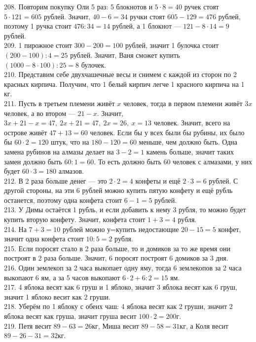 208. Повторим покупку Оли 5 раз: 5 блокнотов и $5\cdot8=40$ ручек стоят $5\cdot121=605$ рублей. Значит, $40-6=34$ ручки стоят $605-129=476$ рублей, поэтому 1 ручка стоит $476:34=14$ рублей, а 1 блокнот --- $121-8\cdot14=9$ рублей.\\
209. 1 пирожное стоит $300-200=100$ рублей, значит 1 булочка стоит $(200-100):4=25$ рублей. Значит, Ваня сможет купить $(1000-8\cdot100):25=8$ булочек.\\
210. Представим себе двухчашечные весы и снимем с каждой из сторон по 2 красных кирпича. Получим, что 1 белый кирпич легче 1 красного кирпича на 1 кг.\\
211. Пусть в третьем племени живёт $x$ человек, тогда в первом племени живёт $3x$ человек, а во втором --- $21-x.$ Значит, $3x+21-x=47,\ 2x+21=47,\ 2x=26,\ x=13$ человек. Значит, всего на острове живёт $47+13=60$ человек. Если бы у всех были бы рубины, их было бы $60\cdot2=120$ штук, что на $180-120=60$ меньше, чем должно быть. Одна замена рубинов на алмазы делает на $3-2=1$ камень больше, значит таких замен должно быть $60:1=60.$ То есть должно быть 60 человек с алмазами, у них будет $60\cdot3=180$ алмазов.\\
212. В 2 раза больше денег --- это $2\cdot2=4$ конфеты и ещё $2\cdot3=6$ рублей. С другой стороны, на эти 6 рублей можно купить пятую конфету и ещё рубль останется, поэтому одна конфета стоит $6-1=5$ рублей.\\
213. У Димы остаётся 1 рубль, и если добавить к нему 3 рубля, то можно будет купить вторую конфету. Значит, конфета стоит $1+3=4$ рубля.\\
214. На $7+3=10$ рублей можно у=купить недостающие  $20-15=5$ конфет, значит одна конфета стоит $10:5=2$ рубля.\\
215. Если поросят стало в 2 раза больше, то и домиков за то же время они построят в 2 раза больше. Значит, 6 поросят построят 6 домиков за 3 дня.\\
216. Один землекоп за 2 часа выкопает одну яму, тогда 6 землекопов за 2 часа выкопают 6 ям, а за 5 часов выкопают $6\cdot2+6:2=15$ ям.\\
217. 4 яблока весят как 6 груш и 1 яблоко, значит 3 яблока весят как 6 груш, значит 1 яблоко весит как 2 груши.\\
218. Уберём по 1 яблоку с обеих чаш: 4 яблока весят как 2 груши, значит 2 яблока весят как груша, значит груша весит $100\cdot2=200$г.\\
219. Петя весит $89-63=26$кг, Миша весит $89-58=31$кг, а Коля весит $89-26-31=32$кг.\\
